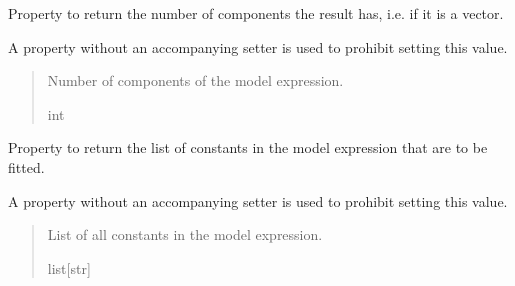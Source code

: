 \documentclass[letterpaper,10pt,english]{sphinxmanual}
\begin{document}
\begin{fulllineitems}
\begin{fulllineitems}
\end{fulllineitems}


\begin{fulllineitems}
\label{\detokenize{VPCModel:src.VPCModel.VPCModel.components}}
\pysigstartsignatures
{}
\pysigstopsignatures
\sphinxAtStartPar
Property to return the number of components the result has, i.e. if it is a vector.

\sphinxAtStartPar
A property without an accompanying setter is used to prohibit setting this value.
\begin{quote}\begin{description}
\sphinxAtStartPar
Number of components of the model expression.

\sphinxAtStartPar
int

\end{description}\end{quote}

\end{fulllineitems}


\begin{fulllineitems}
\label{\detokenize{VPCModel:src.VPCModel.VPCModel.constants}}
\pysigstartsignatures
{}
\pysigstopsignatures
\sphinxAtStartPar
Property to return the list of constants in the model expression that are to be fitted.

\sphinxAtStartPar
A property without an accompanying setter is used to prohibit setting this value.
\begin{quote}\begin{description}
\sphinxAtStartPar
List of all constants in the model expression.

\sphinxAtStartPar
list{[}str{]}

\end{description}\end{quote}


\end{fulllineitems}
\end{fulllineitems}
\end{document}
